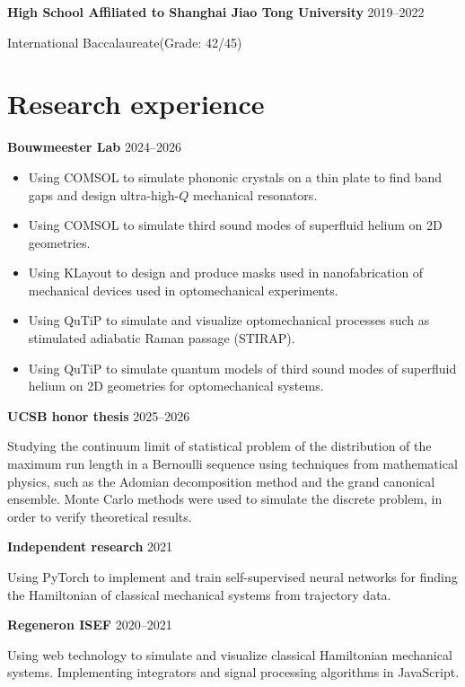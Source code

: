 \documentclass[letterpaper,12pt]{article}
\newenvironment{job}[2]{
	\textbf{#1} \hfill #2\par\vspace{-0.5\baselineskip}
}{}
\begin{document}
\begin{job}{High School Affiliated to Shanghai Jiao Tong University}{2019--2022}
	International Baccalaureate\hfill(Grade: 42/45)
\end{job}

\section{Research experience}

\begin{job}{Bouwmeester Lab}{2024--2026}
\begin{itemize}
	\item Using COMSOL to simulate phononic crystals on a thin plate to find band gaps
	and design ultra-high-$Q$ mechanical resonators.
	\item Using COMSOL to simulate third sound modes of superfluid helium on 2D geometries.
	\item Using KLayout to design and produce masks used in nanofabrication of mechanical devices
	used in optomechanical experiments.
	\item Using QuTiP to simulate and visualize optomechanical processes
	such as stimulated adiabatic Raman passage (STIRAP).
	\item Using QuTiP to simulate quantum models of third sound modes of superfluid helium
	on 2D geometries for optomechanical systems.
\end{itemize}
\end{job}

\begin{job}{UCSB honor thesis}{2025--2026}
	Studying the continuum limit of statistical problem of the distribution of the maximum run length in
	a Bernoulli sequence using techniques from mathematical physics,
	such as the Adomian decomposition method and the grand canonical ensemble.
	Monte Carlo methods were used to simulate the discrete problem,
	in order to verify theoretical results.
\end{job}

\begin{job}{Independent research}{2021}
	Using PyTorch to implement and train self-supervised neural networks
	for finding the Hamiltonian of classical mechanical systems
	from trajectory data.
\end{job}

\begin{job}{Regeneron ISEF}{2020--2021}
	Using web technology to simulate and visualize classical Hamiltonian mechanical systems.
	Implementing integrators and signal processing algorithms in JavaScript.
\end{job}
\end{document}
